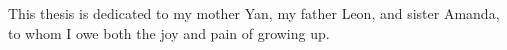 

This thesis is dedicated to my mother Yan, my father Leon, and sister Amanda, to whom I owe both the joy and pain of growing up.